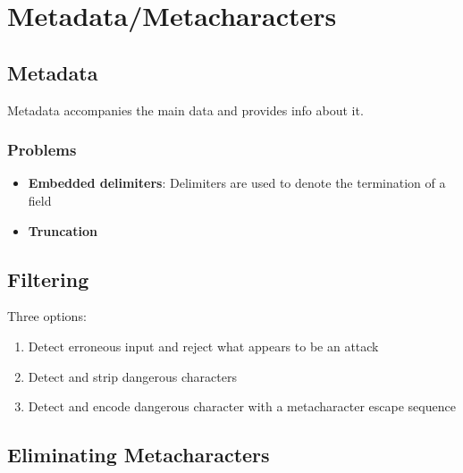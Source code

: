 \documentclass[11pt,a4paper]{article}
\begin{document}
\section{Metadata/Metacharacters}

\subsection{Metadata}

Metadata accompanies the main data and provides info about it.

\subsubsection{Problems}
\begin{itemize}
    \item \textbf{Embedded delimiters}: Delimiters are used to denote the termination of a field
    \item \textbf{Truncation}
\end{itemize}

\subsection{Filtering}

Three options:
\begin{enumerate}
    \item Detect erroneous input and reject what appears to be an attack
    \item Detect and strip dangerous characters
    \item Detect and encode dangerous character with a metacharacter escape sequence
\end{enumerate}

\subsection{Eliminating Metacharacters}
\end{document}

